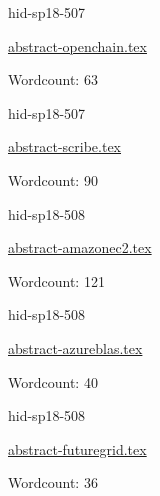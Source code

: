 

\begin{IU}

hid-sp18-507

\href{https://github.com/cloudmesh-community/hid-sp18-507/blob/master//technology/abstract-openchain.tex}{abstract-openchain.tex}

 

Wordcount: 63

\end{IU}



\begin{IU}

hid-sp18-507

\href{https://github.com/cloudmesh-community/hid-sp18-507/blob/master//technology/abstract-scribe.tex}{abstract-scribe.tex}

 

Wordcount: 90

\end{IU}



\begin{IU}

hid-sp18-508

\href{https://github.com/cloudmesh-community/hid-sp18-508/blob/master//technology/abstract-amazonec2.tex}{abstract-amazonec2.tex}

 

Wordcount: 121

\end{IU}



\begin{IU}

hid-sp18-508

\href{https://github.com/cloudmesh-community/hid-sp18-508/blob/master//technology/abstract-azureblas.tex}{abstract-azureblas.tex}

 

Wordcount: 40

\end{IU}



\begin{IU}

hid-sp18-508

\href{https://github.com/cloudmesh-community/hid-sp18-508/blob/master//technology/abstract-futuregrid.tex}{abstract-futuregrid.tex}

 

Wordcount: 36

\end{IU}

